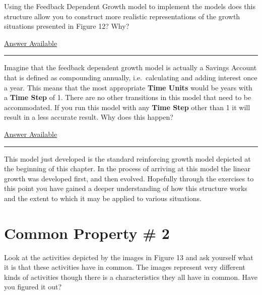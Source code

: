 \documentclass[]{memoir}
\renewcommand{\u}[1]{\textbf{#1}}
\begin{document}

Using the Feedback Dependent Growth model to implement the models does
this structure allow you to construct more realistic representations of
the growth situations presented in Figure 12? Why?

\hyperref[Ans-2-5]{Answer Available}

\begin{center}\rule{3in}{0.4pt}\end{center}


Imagine that the feedback dependent growth model is actually a Savings
Account that is defined as compounding annually, i.e.~calculating and
adding interest once a year. This means that the most appropriate
\u{Time Units} would be years with a \u{Time Step} of 1. There are no
other transitions in this model that need to be accommodated. If you run
this model with any \u{Time Step} other than 1 it will result in a less
accurate result. Why does this happen?

\hyperref[Ans-2-6]{Answer Available}

\begin{center}\rule{3in}{0.4pt}\end{center}

This model just developed is the standard reinforcing growth model
depicted at the beginning of this chapter. In the process of arriving at
this model the linear growth was developed first, and then evolved.
Hopefully through the exercises to this point you have gained a deeper
understanding of how this structure works and the extent to which it may
be applied to various situations.

\section{Common Property \# 2}

Look at the activities depicted by the images in Figure 13 and ask
yourself what it is that these activities have in common. The images
represent very different kinds of activities though there is a
characteristics they all have in common. Have you figured it out?
\end{document}

